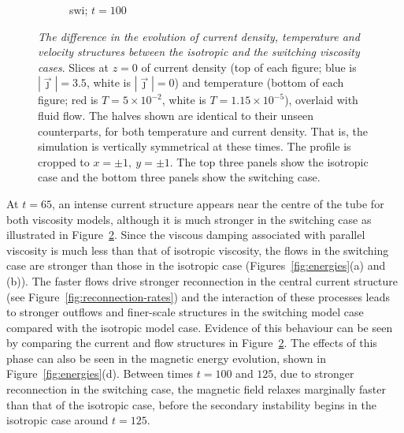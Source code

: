 \begin{figure}[t]
\begin{subfigure}[t]{0.32\textwidth}
    \caption{swi; $t=100$}
    \label{fig:final_switching_current_density_0020}
  \end{subfigure}
  \caption{\textit{The difference in the evolution of current density,
      temperature and velocity structures between the isotropic
        and the switching viscosity cases}. Slices at $z=0$ of
    current density (top of each figure; blue is $|\vec{\jmath}| =
    3.5$, white is $|\vec{\jmath}| = 0$) and temperature (bottom of
    each figure; red is $T = 5\times10^{-2}$, white is
    $T=1.15\times10^{-5}$), overlaid with fluid flow. The halves shown are identical to their unseen counterparts, for both temperature and current density. That is, the simulation is vertically symmetrical at these times. The profile is cropped to
    $x=\pm1,\ y=\pm1$. The top three panels show the
    isotropic case and the bottom three panels show the switching case.}
  \label{fig:turning-point}
\end{figure}

At $t=65$, an intense current structure appears near the centre of the
tube for both viscosity models, although it is much stronger in the
switching case as illustrated in Figure~\ref{fig:turning-point}. Since the viscous damping associated with parallel viscosity is much less than that of isotropic viscosity, the flows in the switching case are stronger than those in the isotropic case (Figures~\ref{fig:energies}(a) and (b)). The faster flows drive stronger reconnection in the central current structure (see Figure~\ref{fig:reconnection-rates}) and the interaction of these processes leads to stronger outflows and finer-scale structures in the switching model case compared with the isotropic model case. Evidence of this behaviour can be seen by comparing the current and flow structures in Figure~\ref{fig:turning-point}. The effects of this phase can also be seen in the magnetic energy evolution, shown in Figure~\ref{fig:energies}(d). Between times $t=100$ and $125$, due to stronger reconnection in the switching case, the magnetic field relaxes marginally faster than that of the isotropic case, before the secondary instability begins in the isotropic case around $t=125$.


